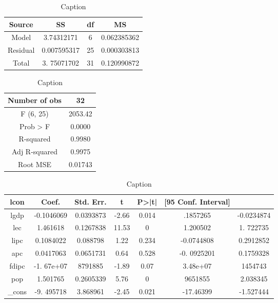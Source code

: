 \begin{table}
    \centering
    \begin{tabular}{|c|c|c|c|} \hline 
         Source&  SS&  df& MS
\\ \hline 
         Model&  3.74312171&  6& 0.062385362
\\ \hline 
         Residual&  0.007595317&  25& 0.000303813
\\ \hline 
         Total&  3. 75071702&  31& 0.120990872\\ \hline
    \end{tabular}
    \caption{Caption}
    \label{tab:my_label}
\end{table}
\begin{table}
    \centering
    \begin{tabular}{|c|c|} \hline 
         Number of obs& 32
\\ \hline 
         F (6, 25)& 2053.42
\\ \hline 
         Prob > F& 0.0000
\\ \hline 
         R-squared& 0.9980
\\ \hline 
         Adj R-squared& 0.9975
\\ \hline 
         Root MSE& 0.01743\\ \hline
    \end{tabular}
    \caption{Caption}
    \label{tab:my_label}
\end{table}

\begin{table}
    \centering
    \begin{tabular}{|c|c|c|c|c|c|c|} \hline 
         lcon&  Coef.&  Std. Err.&  t&  P>|t|&  [95 Conf. Interval]& 
\\ \hline 
         lgdp&  -0.1046069&  0.0393873&  -2.66&  0.014&  ﻿.1857265& -0﻿.0234874
\\ \hline 
         lec&  1.461618&  0.1267838&  11.53&  0&  1.200502& 1. 722735
\\ \hline 
         lipc&  0.1084022&  0.088798&  1.22&  0.234&  -﻿0.0744808& 0.2912852
\\ \hline 
         apc&  0.0417063&  0.0651731&  0.64&  0.528&  ﻿-0. 0925201& 0.1759328
\\ \hline 
         fdipc&  -1. 67e+07&  8791885&  -1.89&  0.07&  ﻿3.48e+07& 1454743
\\ \hline 
         pop&  1.501765&  0.2605339&  5.76&  0&  9651855& 2.038345
\\ \hline 
         _cons&  -9. 495718&  3.868961&  -2.45&  0.021&  -17.46399& ﻿-1.527444\\ \hline
    \end{tabular}
    \caption{Caption}
    \label{tab:my_label}
\end{table}

